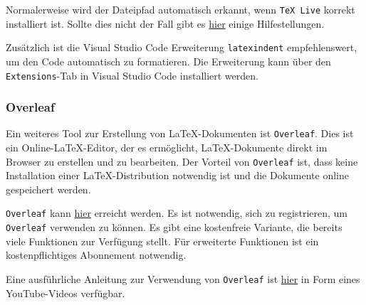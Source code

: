 Normalerweise wird der Dateipfad automatisch erkannt, wenn \texttt{TeX Live} korrekt installiert ist. Sollte dies nicht der Fall gibt es \href{https://github.com/James-Yu/LaTeX-Workshop/wiki/Install#setting-path-environment-variable}{hier} einige Hilfestellungen.

Zusätzlich ist die Visual Studio Code Erweiterung \texttt{latexindent} empfehlenswert, um den Code automatisch zu formatieren. Die Erweiterung kann über den \texttt{Extensions}-Tab in Visual Studio Code installiert werden.


\subsubsection{Overleaf}
\label{sec:overleaf}
Ein weiteres Tool zur Erstellung von \LaTeX{}-Dokumenten ist \texttt{Overleaf}. Dies ist ein Online-\LaTeX{}-Editor, der es ermöglicht, \LaTeX{}-Dokumente direkt im Browser zu erstellen und zu bearbeiten. Der Vorteil von \texttt{Overleaf} ist, dass keine Installation einer \LaTeX{}-Distribution notwendig ist und die Dokumente online gespeichert werden.

\texttt{Overleaf} kann \href{https://www.overleaf.com}{hier} erreicht werden. Es ist notwendig, sich zu registrieren, um \texttt{Overleaf} verwenden zu können. Es gibt eine kostenfreie Variante, die bereits viele Funktionen zur Verfügung stellt. Für erweiterte Funktionen ist ein kostenpflichtiges Abonnement notwendig.

Eine ausführliche Anleitung zur Verwendung von \texttt{Overleaf} ist \href{https://youtu.be/lgiCpA4zzGU?si=xZJ08u8SgERr0tuz}{hier} in Form eines YouTube-Videos verfügbar.

\newpage